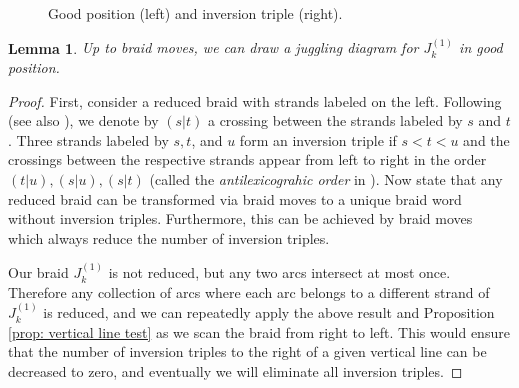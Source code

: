 \documentclass[10pt]{amsart}
\theoremstyle{plain}
\newtheorem{lemma}[thm]{Lemma}
\theoremstyle{definition}
\theoremstyle{remark}
\numberwithin{equation}{section}
\begin{document}
\begin{figure}[ht!]
\caption{Good position (left) and inversion triple (right).}
\label{fig: inversion triple}
\end{figure}

\begin{lemma}
Up to braid moves, we can draw a juggling diagram for $J_k^{(1)}$ in good position.
\end{lemma}

\begin{proof}
First, consider a reduced braid with strands labeled on the left. Following \cite{Elias} (see also \cite{ManinS}), we denote by $(s|t)$ a crossing between the strands labeled by $s$ and $t$. Three strands labeled by $s, t$, and $u$ form an inversion triple if $s<t<u$ and the crossings between the respective strands appear from left to right in the order $(t|u),(s|u),(s|t)$ (called the {\em antilexicograhic order} in \cite{Elias}). %
Now \cite[Proposition 3.15, Corollary 3.16]{Elias} state that any reduced braid can be transformed via braid moves to a unique braid word without inversion triples. Furthermore, this can be achieved by braid moves which always reduce the number of inversion triples.

Our braid $J_k^{(1)}$ is not reduced, but any two arcs intersect at most once.
Therefore any collection of arcs where each arc belongs to a different strand of $J_k^{(1)}$ is reduced, and we can repeatedly apply the above result and Proposition \ref{prop: vertical line test} as we scan the braid from right to left. This would ensure that the number of inversion triples to the right of a given vertical line  can be decreased to zero, and eventually we will eliminate all inversion triples.
\end{proof}
\end{document}
